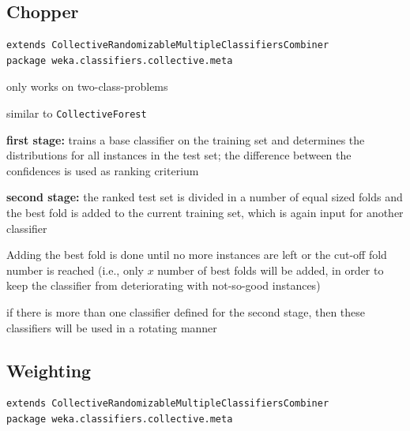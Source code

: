 \documentclass[a4paper]{book}
\begin{document}
\subsection{Chopper}
\begin{verbatim}
extends CollectiveRandomizableMultipleClassifiersCombiner
package weka.classifiers.collective.meta
\end{verbatim}

\begin{tight_itemize}
	\item only works on two-class-problems
	\item similar to \texttt{CollectiveForest}
	\item \textbf{first stage:} trains a base classifier on the training set 
	and determines the distributions for all instances in the test set; the 
	difference between the confidences is used as ranking criterium
	\item \textbf{second stage:} the ranked test set is divided in a number of 
	equal sized folds and the best fold is added to the current training set, 
	which is again input for another classifier
	\item Adding the best fold is done until no more instances are left or the 
	cut-off fold number is reached (i.e., only $x$ number of best folds will 
	be added, in order to keep the classifier from deteriorating with 
	not-so-good instances)
	\item if there is more than one classifier defined for the second stage, 
	then these classifiers will be used in a rotating manner
\end{tight_itemize}


\subsection{Weighting}
\begin{verbatim}
extends CollectiveRandomizableMultipleClassifiersCombiner
package weka.classifiers.collective.meta
\end{verbatim}
\end{document}
